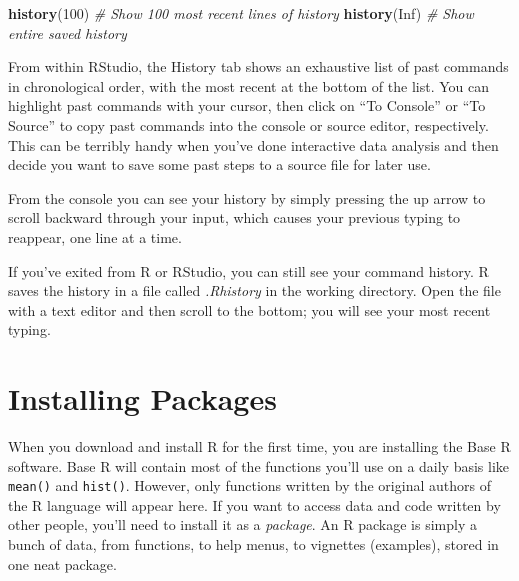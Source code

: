\documentclass[
]{book}
\newenvironment{Shaded}{\begin{snugshade}}{\end{snugshade}}
\newcommand{\CommentTok}[1]{\textcolor[rgb]{0.56,0.35,0.01}{\textit{#1}}}
\newcommand{\DecValTok}[1]{\textcolor[rgb]{0.00,0.00,0.81}{#1}}
\newcommand{\KeywordTok}[1]{\textcolor[rgb]{0.13,0.29,0.53}{\textbf{#1}}}
\newcommand{\NormalTok}[1]{#1}
\newcommand{\OtherTok}[1]{\textcolor[rgb]{0.56,0.35,0.01}{#1}}
\begin{document}
\begin{Shaded}
\begin{Highlighting}[]
\KeywordTok{history}\NormalTok{(}\DecValTok{100}\NormalTok{)          }\CommentTok{# Show 100 most recent lines of history}
\KeywordTok{history}\NormalTok{(}\OtherTok{Inf}\NormalTok{)          }\CommentTok{# Show entire saved history}
\end{Highlighting}
\end{Shaded}

From within RStudio, the History tab shows an exhaustive list of past commands in chronological order, with the most recent at the bottom of the list. You can highlight past commands with your cursor, then click on ``To Console'' or ``To Source'' to copy past commands into the console or source editor, respectively. This can be terribly handy when you've done interactive data analysis and then decide you want to save some past steps to a source file for later use.

From the console you can see your history by simply pressing the up arrow to scroll backward through your input, which causes your previous typing to reappear, one line at a time.

If you've exited from R or RStudio, you can still see your command history. R
saves the history in a file called \emph{.Rhistory} in the working directory. Open the file with a text editor and then scroll to the
bottom; you will see your most recent typing.

\hypertarget{installing-packages}{%
\section{Installing Packages}\label{installing-packages}}

When you download and install R for the first time, you are installing the Base R software. Base R will contain most of the functions you'll use on a daily basis like \texttt{mean()} and \texttt{hist()}. However, only functions written by the original authors of the R language will appear here. If you want to access data and code written by other people, you'll need to install it as a \emph{package}. An R package is simply a bunch of data, from functions, to help menus, to vignettes (examples), stored in one neat package.
\end{document}
